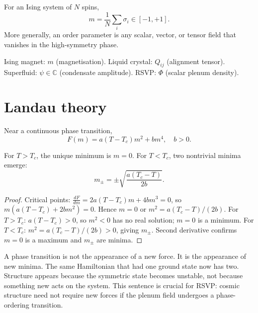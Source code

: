 \begin{definition}
  \label{def:order-param}
  For an Ising system of $N$ spins,
  \[
    m = \frac{1}{N}\sum_i \sigma_i \in [-1,+1].
  \]
  More generally, an order parameter is any scalar, vector,
  or tensor field that vanishes in the high-symmetry phase.
\end{definition}

\begin{example}
  Ising magnet: $m$ (magnetisation).
  Liquid crystal: $Q_{ij}$ (alignment tensor).
  Superfluid: $\psi \in \mathbb{C}$ (condensate amplitude).
  RSVP: $\Phi$ (scalar plenum density).
\end{example}

\section{Landau theory}

\begin{definition}
  \label{def:landau}
  Near a continuous phase transition,
  \[
    F(m) = a(T - T_c)m^2 + bm^4, \quad b > 0.
  \]
\end{definition}

\begin{theorem}
  \label{thm:phase-emergence}
  \statusproven{}
  For $T > T_c$, the unique minimum is $m = 0$.
  For $T < T_c$, two nontrivial minima emerge:
  \[
    m_\pm = \pm\sqrt{\frac{a(T_c - T)}{2b}}.
  \]
\end{theorem}

\begin{proof}
  Critical points: $\frac{dF}{dm} = 2a(T-T_c)m + 4bm^3 = 0$,
  so $m(a(T-T_c) + 2bm^2) = 0$.
  Hence $m = 0$ or $m^2 = a(T_c-T)/(2b)$.
  For $T > T_c$: $a(T-T_c) > 0$, so $m^2 < 0$ has no real
  solution; $m=0$ is a minimum.
  For $T < T_c$: $m^2 = a(T_c-T)/(2b) > 0$, giving $m_\pm$.
  Second derivative confirms $m=0$ is a maximum and $m_\pm$
  are minima.
\end{proof}

\begin{TechNote}
  A phase transition is not the appearance of a new force.
  It is the appearance of new minima.
  The same Hamiltonian that had one ground state now has two.
  Structure appears because the symmetric state becomes unstable,
  not because something new acts on the system.
  This sentence is crucial for RSVP: cosmic structure need not
  require new forces if the plenum field undergoes a
  phase-ordering transition.
\end{TechNote}


